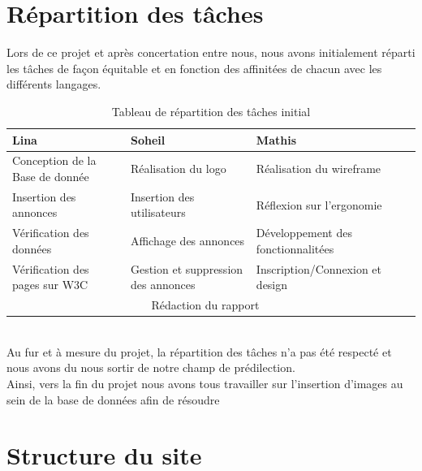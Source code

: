 \documentclass[11pt,a4paper]{article}
\begin{document}
\section{Répartition des tâches}
Lors de ce projet et après concertation entre nous, nous avons initialement réparti les tâches de façon équitable et en fonction des affinitées de chacun avec les différents langages.
\begin{table}[h]
    \begin{center}
        \begin{tabularx}{16.3cm}{|p{5cm}|p{5cm}|p{5cm}|X|}
            \hline
            Lina & Soheil & Mathis \\
            \hline
            Conception de la Base de donnée & Réalisation du logo & Réalisation du wireframe \\
            Insertion des annonces & Insertion des utilisateurs & Réflexion sur l'ergonomie \\
            Vérification des données & Affichage des annonces & Développement des fonctionnalitées \\
            Vérification des pages sur W3C & Gestion et suppression des annonces & Inscription/Connexion et design \\
            \hline
            \multicolumn{3}{|c|}{Rédaction du rapport} \\
        \hline
        \end{tabularx}
        \caption{Tableau de répartition des tâches initial}
    \end{center}
\end{table}
\\Au fur et à mesure du projet, la répartition des tâches n'a pas été respecté et nous avons du nous sortir de notre champ de prédilection.\\
Ainsi, vers la fin du projet nous avons tous travailler sur l'insertion d'images au sein de la base de données afin de résoudre
\section{Structure du site}
\end{document}
